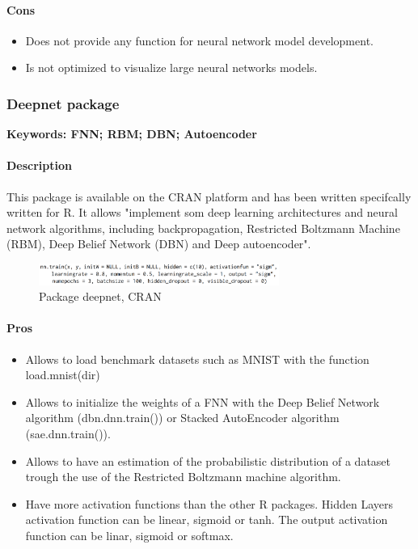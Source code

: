 \documentclass[6pt,letter]{article}\usepackage[]{graphicx}\usepackage[]{color}
\begin{document}
\paragraph{Cons}
\begin{itemize}
\item Does not provide any function for neural network model development.
\item Is not optimized to visualize large neural networks models.
\end{itemize}



\subsubsection{Deepnet package}
\textbf{Keywords: FNN; RBM; DBN; Autoencoder}
\paragraph{Description}
This package is available on the CRAN platform and has been written specifcally written for R. It allows "implement som deep learning architectures and neural network algorithms, including backpropagation, Restricted Boltzmann Machine (RBM), Deep Belief Network (DBN) and Deep autoencoder".
\begin{figure}[h]
    \centering
    \includegraphics[width=0.7\textwidth]{figure/deepnet_package.png}
     \caption{Package deepnet, CRAN}
\end{figure}
\paragraph{Pros}
\begin{itemize}
\item Allows to load benchmark datasets such as MNIST with the function load.mnist(dir)
\item Allows to initialize the weights of a FNN with the Deep Belief Network algorithm (dbn.dnn.train()) or Stacked AutoEncoder algorithm (sae.dnn.train()).
\item Allows to have an estimation of the probabilistic distribution of a dataset trough the use of the Restricted Boltzmann machine algorithm.
\item Have more activation functions than the other R packages. Hidden Layers activation function can be linear, sigmoid or tanh. The output activation function can be linar, sigmoid or softmax.
\end{itemize}
\end{document}
